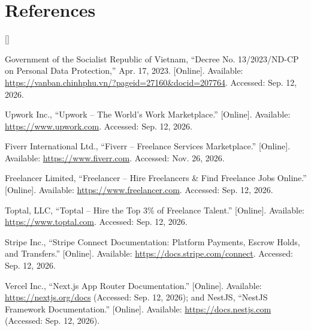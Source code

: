 \section{References}

\begin{list}{[]}{\leftmargin=1.2cm\itemsep=6pt\parsep=0pt}
\item Government of the Socialist Republic of Vietnam, ``Decree No. 13/2023/ND-CP on Personal Data Protection,'' Apr. 17, 2023. [Online]. Available: \url{https://vanban.chinhphu.vn/?pageid=27160&docid=207764}. Accessed: Sep. 12, 2026.

\item Upwork Inc., ``Upwork -- The World's Work Marketplace.'' [Online]. Available: \url{https://www.upwork.com}. Accessed: Sep. 12, 2026.

\item Fiverr International Ltd., ``Fiverr -- Freelance Services Marketplace.'' [Online]. Available: \url{https://www.fiverr.com}. Accessed: Nov. 26, 2026.

\item Freelancer Limited, ``Freelancer -- Hire Freelancers \& Find Freelance Jobs Online.'' [Online]. Available: \url{https://www.freelancer.com}. Accessed: Sep. 12, 2026.

\item Toptal, LLC, ``Toptal -- Hire the Top 3\% of Freelance Talent.'' [Online]. Available: \url{https://www.toptal.com}. Accessed: Sep. 12, 2026.

\item Stripe Inc., ``Stripe Connect Documentation: Platform Payments, Escrow Holds, and Transfers.'' [Online]. Available: \url{https://docs.stripe.com/connect}. Accessed: Sep. 12, 2026.

\item Vercel Inc., ``Next.js App Router Documentation.'' [Online]. Available: \url{https://nextjs.org/docs} (Accessed: Sep. 12, 2026); and NestJS, ``NestJS Framework Documentation.'' [Online]. Available: \url{https://docs.nestjs.com} (Accessed: Sep. 12, 2026).
\end{list}
